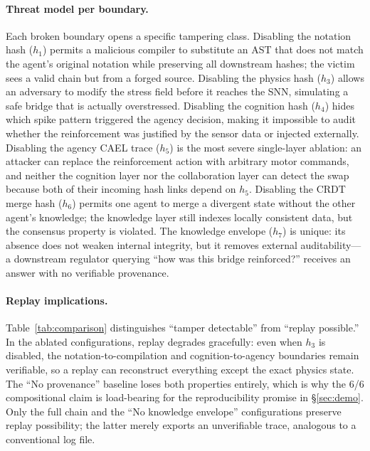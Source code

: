 \documentclass[sigchi-a]{acmart}
\begin{document}
\paragraph{Threat model per boundary.}
Each broken boundary opens a specific tampering class.  Disabling the
notation hash ($h_1$) permits a malicious compiler to substitute an
AST that does not match the agent's original notation while preserving
all downstream hashes; the victim sees a valid chain but from a forged
source.  Disabling the physics hash ($h_3$) allows an adversary to
modify the stress field before it reaches the SNN, simulating a safe
bridge that is actually overstressed.  Disabling the cognition hash
($h_4$) hides which spike pattern triggered the agency decision,
making it impossible to audit whether the reinforcement was justified
by the sensor data or injected externally.  Disabling the agency CAEL
trace ($h_5$) is the most severe single-layer ablation: an attacker
can replace the reinforcement action with arbitrary motor commands,
and neither the cognition layer nor the collaboration layer can
detect the swap because both of their incoming hash links depend on
$h_5$.  Disabling the CRDT merge hash ($h_6$) permits one agent to
merge a divergent state without the other agent's knowledge; the
knowledge layer still indexes locally consistent data, but the
consensus property is violated.  The knowledge envelope ($h_7$) is
unique: its absence does not weaken internal integrity, but it
removes external auditability---a downstream regulator querying
``how was this bridge reinforced?'' receives an answer with no
verifiable provenance.

\paragraph{Replay implications.}
Table~\ref{tab:comparison} distinguishes ``tamper detectable'' from
``replay possible.''  In the ablated configurations, replay degrades
gracefully: even when $h_3$ is disabled, the notation-to-compilation
and cognition-to-agency boundaries remain verifiable, so a replay can
reconstruct everything except the exact physics state.  The ``No
provenance'' baseline loses both properties entirely, which is why the
6/6 compositional claim is load-bearing for the reproducibility
promise in \S\ref{sec:demo}.  Only the full chain and the ``No
knowledge envelope'' configurations preserve replay possibility; the
latter merely exports an unverifiable trace, analogous to a
conventional log file.
\end{document}
